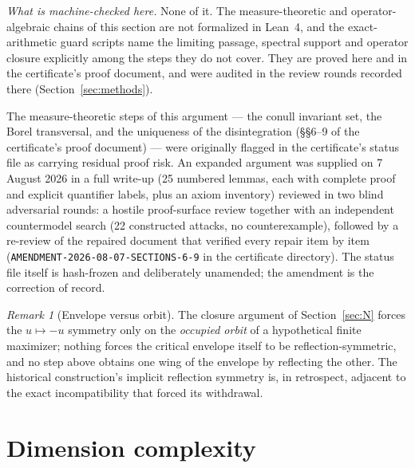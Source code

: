 \documentclass[11pt]{article}
\theoremstyle{remark}
\newtheorem{remark}[theorem]{Remark}
\begin{document}
\emph{What is machine-checked here.} None of it. The measure-theoretic and
operator-algebraic chains of this section are not formalized in Lean~4, and
the exact-arithmetic guard scripts name the limiting passage, spectral
support and operator closure explicitly among the steps they do not cover.
They are proved here and in the certificate's proof document, and were
audited in the review rounds recorded there (Section~\ref{sec:methods}).

The measure-theoretic steps of this argument --- the conull invariant
set, the Borel transversal, and the uniqueness of the disintegration
(\S\S6--9 of the certificate's proof document) --- were originally
flagged in the certificate's status file as carrying residual proof
risk. An expanded argument was supplied on 7 August 2026 in a full
write-up (25 numbered lemmas, each with complete proof and explicit
quantifier labels, plus an axiom inventory) reviewed in two blind
adversarial rounds: a hostile proof-surface review together with an
independent countermodel search (22 constructed attacks, no
counterexample), followed by a re-review of the repaired document that
verified every repair item by item
(\texttt{AMENDMENT-2026-08-07-SECTIONS-6-9} in the certificate
directory). The status file itself is hash-frozen and deliberately
unamended; the amendment is the correction of record.

\begin{remark}[Envelope versus orbit]
The closure argument of Section~\ref{sec:N} forces the $u\mapsto-u$
symmetry only on the \emph{occupied orbit} of a hypothetical finite
maximizer; nothing forces the critical envelope itself to be
reflection-symmetric, and no step above obtains one wing of the envelope by
reflecting the other. The historical construction's implicit reflection
symmetry is, in retrospect, adjacent to the exact incompatibility that
forced its withdrawal.
\end{remark}

\section{Dimension complexity}\label{sec:rate}
\end{document}
